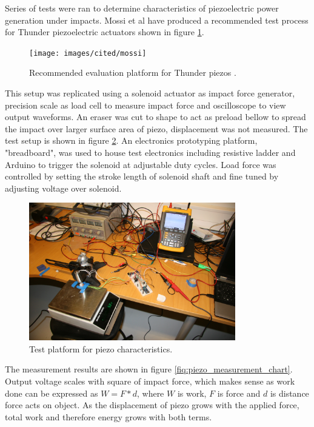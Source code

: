 Series of tests were ran to determine characteristics of piezoelectric power generation under impacts. Mossi et al \cite{Mossi} have produced a recommended test process for Thunder piezoelectric actuators shown in figure \ref{fiq:thunder_eval}.

\begin{figure}[htb]
  \begin{center}
  \texttt{[image: images/cited/mossi]}
  \end{center}
  \caption{Recommended evaluation platform for Thunder piezos \cite{Mossi}.}
  \label{fiq:thunder_eval}
\end{figure}

This setup was replicated using a solenoid actuator as impact force generator, precision scale as load cell to measure impact force and oscilloscope to view output waveforms. An eraser was cut to shape to act as preload bellow to spread the impact over larger surface area of piezo, displacement was not measured. The test setup is shown in figure \ref{fiq:piezo_impact}. An electronics prototyping platform, "breadboard", was used to house test electronics including resistive ladder and Arduino to trigger the solenoid at adjustable duty cycles. Load force was controlled by setting the stroke length of solenoid shaft and fine tuned by adjusting voltage over solenoid. 

\begin{figure}[htb]
  \begin{center}
  \includegraphics[height=6cm]{images/own_pic/piezo_test}
  \end{center}
  \caption{Test platform for piezo characteristics.}
  \label{fiq:piezo_impact}
\end{figure}

The measurement results are shown in figure \ref{fiq:piezo_measurement_chart}. Output voltage scales with square of impact force, which makes sense as work done can be expressed as $W = F * d$, where $W$ is work, $F$ is force and $d$ is distance force acts on object. As the displacement of piezo grows with the applied force, total work and therefore energy grows with both terms. 

